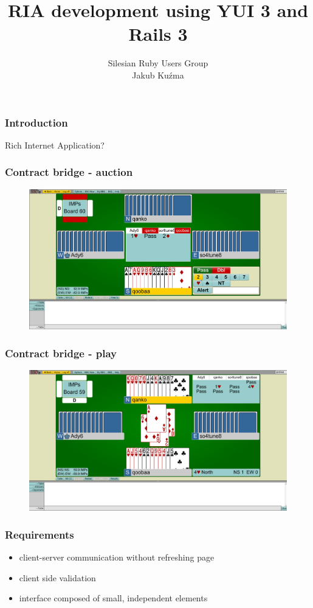 \documentclass[16pt]{beamer}
\author{Silesian Ruby Users Group\\
  \footnotesize{Jakub Kuźma}}
\title{RIA development using YUI 3 and Rails 3}
\begin{document}
\frame{\titlepage}

\begin{frame}
  \frametitle{Introduction}
  \begin{center}
    Rich Internet Application?
  \end{center}
\end{frame}

\begin{frame}
  \frametitle{Contract bridge - auction}
  \begin{figure}
    \includegraphics[width=\linewidth]{bbo-auction.png}
  \end{figure}
\end{frame}

\begin{frame}
  \frametitle{Contract bridge - play}
  \begin{figure}
    \includegraphics[width=\linewidth]{bbo-play.png}
  \end{figure}
\end{frame}

\begin{frame}
  \frametitle{Requirements}
  \begin{itemize}
  \item client-server communication without refreshing page
  \item client side validation
  \item interface composed of small, independent elements
  \end{itemize}
\end{frame}
\end{document}
